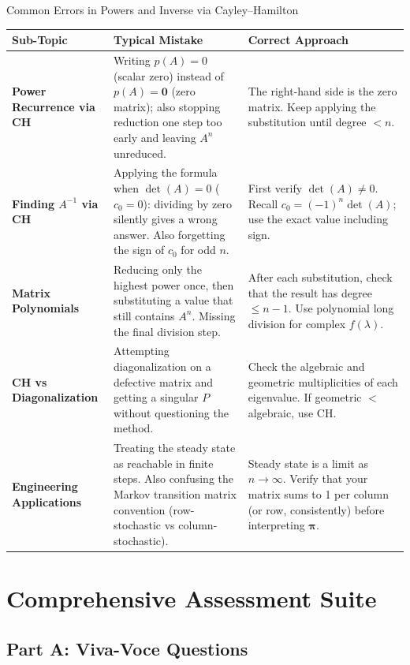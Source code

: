 \documentclass[12pt,a4paper]{article}
\begin{document}
\begin{mistakebox}{Common Errors in Powers and Inverse via Cayley--Hamilton}
\begin{tabular}{>{\bfseries}p{3.5cm} p{5.5cm} p{4.5cm}}
\toprule
Sub-Topic & Typical Mistake & Correct Approach \\
\midrule
Power Recurrence via CH &
  Writing \(p(A)=0\) (scalar zero) instead of \(p(A)=\mathbf{0}\) (zero matrix); also stopping reduction one step too early and leaving \(A^n\) unreduced. &
  The right-hand side is the zero matrix. Keep applying the substitution until degree \(< n\). \\
\addlinespace
Finding \(A^{-1}\) via CH &
  Applying the formula when \(\det(A) = 0\) (\(c_0 = 0\)): dividing by zero silently gives a wrong answer. Also forgetting the sign of \(c_0\) for odd \(n\). &
  First verify \(\det(A) \neq 0\). Recall \(c_0 = (-1)^n \det(A)\); use the exact value including sign. \\
\addlinespace
Matrix Polynomials & Reducing only the highest power once, then substituting a value that still contains \(A^n\). Missing the final division step. &
  After each substitution, check that the result has degree \(\leq n-1\). Use polynomial long division for complex \(f(\lambda)\). \\
\addlinespace
CH vs Diagonalization & Attempting diagonalization on a defective matrix and getting a singular \(P\) without questioning the method. &
  Check the algebraic and geometric multiplicities of each eigenvalue. If geometric \(<\) algebraic, use CH. \\
\addlinespace
Engineering Applications & Treating the steady state as reachable in finite steps. Also confusing the Markov transition matrix convention (row-stochastic vs column-stochastic). &
  Steady state is a limit as \(n \to \infty\). Verify that your matrix sums to 1 per column (or row, consistently) before interpreting \(\boldsymbol{\pi}\). \\
\bottomrule
\end{tabular}
\end{mistakebox}

\section{Comprehensive Assessment Suite}

\subsection*{Part A: Viva-Voce Questions}
\end{document}
